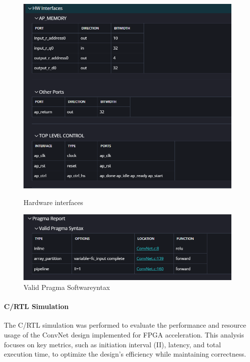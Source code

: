 \documentclass{article}
\begin{document}
\begin{figure}[H]
    \centering
    \begin{minipage}{0.49\textwidth}
        \centering
        \includegraphics[width=1\textwidth]{./assets/ConvNet/c-synthesis-HWinterfaces.png}
        \caption{Hardware interfaces}
        \label{fig:convnet-c-synthesis-hw-interfaces}
    \end{minipage}
    \hfill
    \begin{minipage}{0.49\textwidth}
        \centering
        \includegraphics[width=1\textwidth]{./assets/ConvNet/c-synthesis-validpragmasyntax.png}
        \caption{Valid Pragma Softwareyntax}
        \label{fig:convnet-c-synthesis-pragma-syntax}
    \end{minipage}
\end{figure}


\paragraph{C/RTL Simulation}
The C/RTL simulation was performed to evaluate the performance and resource usage of the ConvNet design implemented for FPGA acceleration. This analysis focuses on key metrics, such as initiation interval (II), latency, and total execution time, to optimize the design's efficiency while maintaining correctness.
\end{document}
